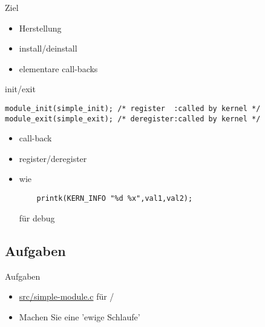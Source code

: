 
\begin{frame}{Ziel}{}
 \begin{itemize}
  \item Herstellung 
  \item install/deinstall
  \item elementare call-backs
 \end{itemize}
\end{frame}

\begin{frame}[fragile]{}{init/exit}
 \begin{lstlisting}
module_init(simple_init); /* register  :called by kernel */
module_exit(simple_exit); /* deregister:called by kernel */
 \end{lstlisting}
 \begin{itemize}
  \item call-back
  \item register/deregister
  \item {} wie 
  \begin{lstlisting}
    printk(KERN_INFO "%d %x",val1,val2);
  \end{lstlisting}
  für debug
 \end{itemize}
\end{frame}

\subsection{Aufgaben}
\begin{frame}{Aufgaben}
 \begin{itemize}
  \item \url{src/simple-module.c} für \host/\targetS
  \item Machen Sie eine 'ewige Schlaufe'
  \end{itemize}
\end{frame}
